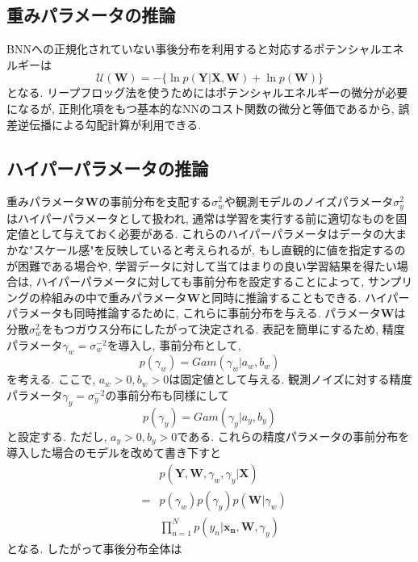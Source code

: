 \documentclass[twocolumn]{jarticle}
\begin{document}
\subsection{重みパラメータの推論}
BNNへの正規化されていない事後分布を利用すると対応するポテンシャルエネルギーは
\begin{equation}
  \mathcal{U}(\bm {W}) = - \{\ln p(\bm {Y|X, W}) + \ln p (\bm {W})\}
\end{equation}
となる. リープフロッグ法を使うためにはポテンシャルエネルギーの微分が必要になるが, 正則化項をもつ基本的なNNのコスト関数の微分と等価であるから, 誤差逆伝播による勾配計算が利用できる.

\subsection{ハイパーパラメータの推論}
重みパラメータ${\bm {W}}$の事前分布を支配する${\sigma_w^2}$や観測モデルのノイズパラメータ${\sigma_y^2}$はハイパーパラメータとして扱われ, 通常は学習を実行する前に適切なものを固定値として与えておく必要がある. これらのハイパーパラメータはデータの大まかな"スケール感"を反映していると考えられるが, もし直観的に値を指定するのが困難である場合や, 学習データに対して当てはまりの良い学習結果を得たい場合は, ハイパーパラメータに対しても事前分布を設定することによって, サンプリングの枠組みの中で重みパラメータ${\bm {W}}$と同時に推論することもできる.
ハイパーパラメータも同時推論するために, これらに事前分布を与える. パラメータ${\bm {W}}$は分散${\sigma_w^2}$をもつガウス分布にしたがって決定される. 表記を簡単にするため, 精度パラメータ${\gamma_w = \sigma_w^{-2}}$を導入し, 事前分布として,
\begin{equation}
  p(\gamma_w) = Gam (\gamma_w | a_w, b_w)
\end{equation}
を考える. ここで, ${a_w > 0, b_w > 0}$は固定値として与える. 観測ノイズに対する精度パラメータ${\gamma_y = \sigma_y^{-2}}$の事前分布も同様にして
\begin{equation}
  p(\gamma _y) = Gam (\gamma_y|a_y, b_y)
\end{equation}
と設定する. ただし, ${a_y > 0, b_y > 0}$である.
これらの精度パラメータの事前分布を導入した場合のモデルを改めて書き下すと
\begin{eqnarray}
  && p(\bm {Y, W}, \gamma_w, \gamma_y | \bm {X}) \nonumber \\
  &=& p(\gamma_w)p(\gamma_y)p(\bm {W} | \gamma_w) \nonumber \\
  && \prod _{n = 1}^{N} p(y_n|\bm {x_n, W}, \gamma_y)
\end{eqnarray}
となる. したがって事後分布全体は
\end{document}
